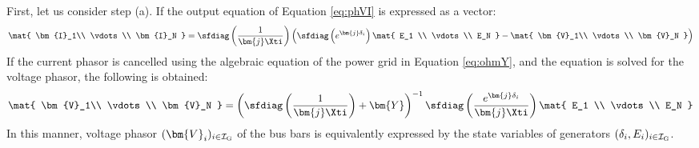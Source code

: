 \documentclass[graybox, envcountchap]{svmult}
\begin{document}
First, let us consider step (a).
If the output equation of Equation \ref{eq:phVI} is expressed as a vector:
\[
\mat{
\bm{I}_1\\
\vdots \\
\bm{I}_N
}
=
\sfdiag \left(
\frac{1}{\bm{j} \Xti }
\right)
\left(
\sfdiag \left(
e^{\bm{j} \delta_i}
\right)
\mat{
E_1  \\
\vdots \\
E_N 
}
-
\mat{
\bm{V}_1\\
\vdots \\
\bm{V}_N
}
\right)
\]
If the current phasor is cancelled using the algebraic equation of the power grid in Equation \ref{eq:ohmY}, and the equation is solved for the voltage phasor, the following is obtained:
\begin{align}\label{eq:colVi}
\mat{
\bm{V}_1\\
\vdots \\
\bm{V}_N
} =
\left(
\sfdiag \left(
\frac{1}{\bm{j} \Xti }
\right) + 
\bm{Y}
\right)^{-1}
\sfdiag\left(
\frac{e^{\bm{j} \delta_i}}{\bm{j} \Xti }
\right)
\mat{
E_1  \\
\vdots \\
E_N 
}
\end{align}
In this manner, voltage phasor $(\bm{V}_i)_{i\in \mathcal{I}_{\rm G}}$ of the bus bars is equivalently expressed by the state variables of generators $(\delta_i,E_i)_{i\in \mathcal{I}_{\rm G}}$.
\end{document}
